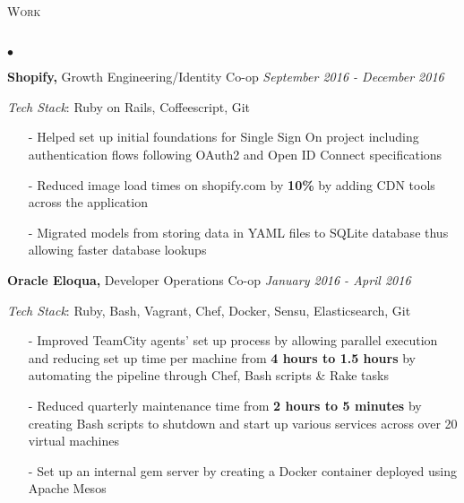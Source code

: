 \documentclass[11pt]{article}
\newcommand{\lineunder}{\vspace*{-8pt} \\ \hspace*{-18pt} \hrulefill \\}
\newcommand{\header}[1]{{\hspace*{-15pt}\vspace*{6pt} \textsc{#1}} \vspace*{-6pt} \lineunder }
\newenvironment{achievements}{\begin{list}{$\bullet$}{\topsep 0pt \itemsep -1.5pt \leftmargin 5pt}}{\vspace*{4pt}\end{list}}
\begin{document}
\header{\fontsize{11.4}{10}\selectfont Work}
\begin{achievements}

\item \textbf{Shopify,} Growth Engineering/Identity Co-op \hfill \textit {September 2016 - December 2016}

\vspace{2pt}
\item[ ] \textit{Tech Stack}: Ruby on Rails, Coffeescript, Git
\vspace{3pt}

\begin{itemize}

\item[-] Helped set up initial foundations for Single Sign On project including authentication flows following OAuth2 and Open ID Connect specifications
\vspace{3pt}
\item[-] Reduced image load times on shopify.com by \textbf{10\%} by adding CDN tools across the application
\vspace{3pt}
\item[-] Migrated models from storing data in YAML files to SQLite database thus allowing faster database lookups

\end{itemize}

\vspace{6pt}

\item \textbf{Oracle Eloqua,} Developer Operations Co-op \hfill \textit {January 2016 - April 2016}

\vspace{2pt}
\item[ ] \textit{Tech Stack}: Ruby, Bash, Vagrant, Chef, Docker, Sensu, Elasticsearch, Git
\vspace{3pt}

\begin{itemize}
\item[-]Improved TeamCity agents' set up process by allowing parallel execution and reducing set up time per machine from \textbf{4 hours to 1.5 hours} by automating the pipeline through Chef, Bash scripts \& Rake tasks
\vspace{3pt}
\item[-]Reduced quarterly maintenance time from  \textbf{2 hours to 5 minutes} by creating Bash scripts to shutdown and start up various services across over 20 virtual machines
\vspace{3pt}
\item[-]Set up an internal gem server by creating a Docker container deployed using Apache Mesos
\end{itemize}


\end{achievements}
\end{document}
